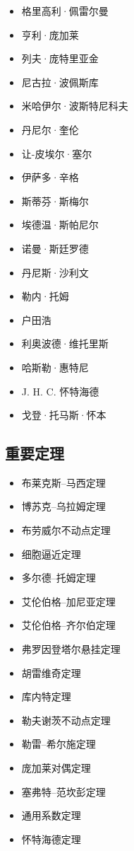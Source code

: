 \begin{itemize}
\item 格里高利·佩雷尔曼
\item 亨利·庞加莱
\item 列夫·庞特里亚金
\item 尼古拉·波佩斯库
\item 米哈伊尔·波斯特尼科夫
\item 丹尼尔·奎伦
\item 让-皮埃尔·塞尔
\item 伊萨多·辛格
\item 斯蒂芬·斯梅尔
\item 埃德温·斯帕尼尔
\item 诺曼·斯廷罗德
\item 丹尼斯·沙利文
\item 勒内·托姆
\item 户田浩
\item 利奥波德·维托里斯
\item 哈斯勒·惠特尼
\item J. H. C. 怀特海德
\item 戈登·托马斯·怀本
\end{itemize}
\subsection{重要定理}
\begin{itemize}
\item 布莱克斯–马西定理
\item 博苏克–乌拉姆定理
\item 布劳威尔不动点定理
\item 细胞逼近定理
\item 多尔德–托姆定理
\item 艾伦伯格–加尼亚定理
\item 艾伦伯格–齐尔伯定理
\item 弗罗因登塔尔悬挂定理
\item 胡雷维奇定理
\item 库内特定理
\item 勒夫谢茨不动点定理
\item 勒雷–希尔施定理
\item 庞加莱对偶定理
\item 塞弗特–范坎彭定理
\item 通用系数定理
\item 怀特海德定理
\end{itemize}
